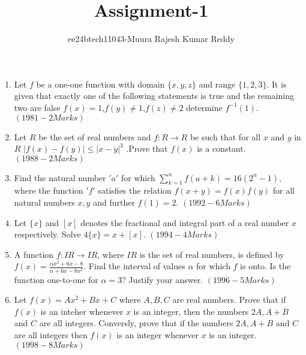\documentclass[journal,12pt,twocolumn]{IEEEtran}
\theoremstyle{remark}
\begin{document}

\vspace{3cm}

\title{Assignment-1}
\author{ee24btech11043-Muura Rajesh Kumar Reddy}
\maketitle
\newpage
\bigskip

\renewcommand{\thefigure}{\theenumi}
\renewcomnand{\thetable}{\theenumi}

		\begin{enumerate}[start=6]
	\item Let $f$ be a one-one function with domain $\{x,y,z\}$ and range $\{1,2,3\}$. It is given that exactly one of the following statements is true and the remaining two are false ${f(x)=1}$,${f(y)\neq1}$,$f(z)\neq2$ determine $f^{-1}(1)$. \hfill${(1981 - 2 Marks)}$
	\item Let $R$ be the set of real numbers and $f:R \to R$ be such that for all $x$ and $y$ in $R$ ${|f(x)-f(y)| \le |x-y|^3}$ .Prove that $f(x)$ is a constant. \hfill${(1988 - 2 Marks)}$
	\item Find the natural number $'a'$ for which ${\sum\limits_{k=1}^nf(a+k)=16(2^n -1)}$, where the function $'f'$ satisfies the relation ${f(x+y)=f(x)f(y)}$ for all natural numbers $x,y$ and further ${f(1)=2}$. \hfill${(1992- 6 Marks)}$
	\item Let $\{x\}$ and $[x]$ denotes the fractional and integral part of a real number $x$ respectively. Solve $4\{x\}=x+[x]$. \hfill${(1994- 4 Marks)}$
	\item A function $f:IR\to IR$, where $IR$ is the set of real numbers, is defined by ${f(x)=\frac{\alpha x^2 +6x -8}{\alpha +6x-8x^2}}$. Find the interval of values $\alpha$ for which $f$ is onto. Is the function one-to-one for $\alpha=3$? Justify your answer. \hfill${(1996- 5 Marks)}$
	\item Let ${f(x)=Ax^2+Bx+C}$ where $A,B,C$ are real numbers. Prove that if $f(x)$ is an inteher whenever $x$ is an integer, then the numbers $2A,A+B$ and $C$ are all integers. Conversly, prove that if the numbers $2A,A+B$ and $C$ are all integers then $f(x)$ is an integer whenever $x$ is an integer. \hfill${(1998- 8 Marks)}$ 
		 \end{enumerate}
	\onecolumn
\end{document}
